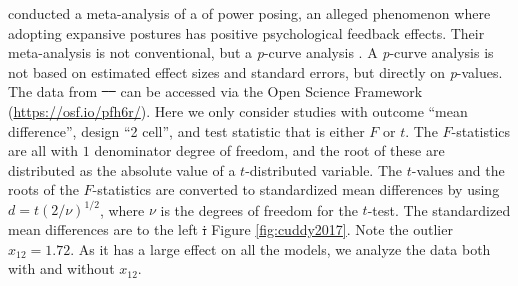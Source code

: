 \documentclass[useAMS,usenatbib,referee]{biom}
\renewcommand{\sqrt}[1]{(#1)^{1/2}}
\providecommand{\DIFaddtex}[1]{{\protect\color{green}\uwave{#1}}} %
\providecommand{\DIFdeltex}[1]{{\protect\color{red}\sout{#1}}}                      %
\providecommand{\DIFaddbegin}{} %
\providecommand{\DIFaddend}{} %
\providecommand{\DIFdelbegin}{} %
\providecommand{\DIFdelend}{} %
\providecommand{\DIFadd}[1]{\texorpdfstring{\DIFaddtex{#1}}{#1}} %
\providecommand{\DIFdel}[1]{\texorpdfstring{\DIFdeltex{#1}}{}} %
\begin{document}
\citet{cuddy2018p} conducted a meta-analysis of a of power posing, an alleged phenomenon where adopting expansive postures has positive psychological feedback effects. Their meta-analysis is not conventional, but a \textit{p}-curve analysis \citep{simonsohn2014p}. A \textit{p}-curve analysis is not based on estimated effect sizes and standard errors, but directly on \textit{p}-values. The data from \DIFdelbegin \DIFdel{\mbox{%
\citep{cuddy2018p} }\hspace{0pt}%
}\DIFdelend \DIFaddbegin \DIFadd{\mbox{%
\citet{cuddy2018p} }\hspace{0pt}%
}\DIFaddend can be accessed via the Open Science Framework (\url{https://osf.io/pfh6r/}). Here we only consider studies with outcome \enquote{mean difference}, design \enquote{2 cell}, and test statistic that is either $F$ or $t$. The $F$-statistics are all with $1$ denominator degree of freedom, and the root of these are distributed as the absolute value of a $t$-distributed variable. The $t$-values and the roots of the $F$-statistics are converted to standardized mean differences by using $d = t\sqrt{2/\nu}$, where $\nu$ is the degrees of freedom for the $t$-test. The standardized mean differences are to the left \DIFdelbegin \DIFdel{i }\DIFdelend \DIFaddbegin \DIFadd{in }\DIFaddend Figure \ref{fig:cuddy2017}. Note the outlier $x_{12} = 1.72$. As it has a large effect on all the models, we analyze the data both with and without $x_{12}$.
\end{document}
